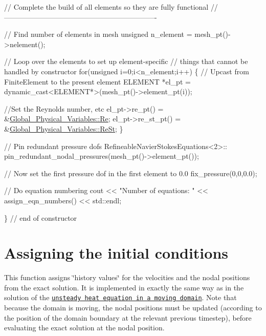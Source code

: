 \begin{DoxyCodeInclude}

 
 \textcolor{comment}{// Complete the build of all elements so they are fully functional}
 \textcolor{comment}{//----------------------------------------------------------------}

 \textcolor{comment}{// Find number of elements in mesh}
 \textcolor{keywordtype}{unsigned} n\_element = mesh\_pt()->nelement();

 \textcolor{comment}{// Loop over the elements to set up element-specific }
 \textcolor{comment}{// things that cannot be handled by constructor}
 \textcolor{keywordflow}{for}(\textcolor{keywordtype}{unsigned} i=0;i<n\_element;i++)
  \{
   \textcolor{comment}{// Upcast from FiniteElement to the present element}
   ELEMENT *el\_pt = \textcolor{keyword}{dynamic\_cast<}ELEMENT*\textcolor{keyword}{>}(mesh\_pt()->element\_pt(i));

   \textcolor{comment}{//Set the Reynolds number, etc}
   el\_pt->re\_pt() = &\hyperlink{namespaceGlobal__Physical__Variables_ab814e627d2eb5bc50318879d19ab16b9}{Global\_Physical\_Variables::Re};
   el\_pt->re\_st\_pt() = &\hyperlink{namespaceGlobal__Physical__Variables_a085ee4bf968ffdd01a41b8c41864f907}{Global\_Physical\_Variables::ReSt};
  \}

 \textcolor{comment}{// Pin redundant pressure dofs}
 RefineableNavierStokesEquations<2>::
  pin\_redundant\_nodal\_pressures(mesh\_pt()->element\_pt());
 
 \textcolor{comment}{// Now set the first pressure dof in the first element to 0.0}
 fix\_pressure(0,0,0.0);

 \textcolor{comment}{// Do equation numbering}
 cout << \textcolor{stringliteral}{"Number of equations: "} << assign\_eqn\_numbers() << std::endl; 

\} \textcolor{comment}{// end of constructor}

\end{DoxyCodeInclude}




 

\hypertarget{index_IC}{}\section{Assigning the initial conditions}\label{index_IC}
This function assigns \char`\"{}history values\char`\"{} for the velocities and the nodal positions from the exact solution. It is implemented in exactly the same way as in the solution of the \href{../../../unsteady_heat/two_d_unsteady_heat_ALE/html/index.html#IC}{\tt unsteady heat equation in a moving domain}. Note that because the domain is moving, the nodal positions must be updated (according to the position of the domain boundary at the relevant previous timestep), before evaluating the exact solution at the nodal position.


